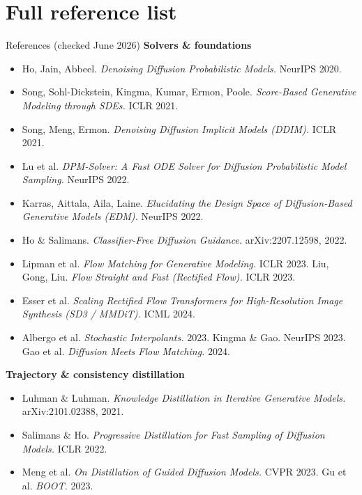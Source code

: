\documentclass[aspectratio=169,10pt]{beamer}
\begin{document}
\section{Full reference list}

\begin{frame}[allowframebreaks]{References (checked June 2026)}
  \scriptsize
  \textbf{Solvers \& foundations}
  \begin{itemize}
    \item Ho, Jain, Abbeel. \emph{Denoising Diffusion Probabilistic Models.} NeurIPS 2020.
    \item Song, Sohl-Dickstein, Kingma, Kumar, Ermon, Poole. \emph{Score-Based Generative Modeling through SDEs.} ICLR 2021.
    \item Song, Meng, Ermon. \emph{Denoising Diffusion Implicit Models (DDIM).} ICLR 2021.
    \item Lu et al. \emph{DPM-Solver: A Fast ODE Solver for Diffusion Probabilistic Model Sampling.} NeurIPS 2022.
    \item Karras, Aittala, Aila, Laine. \emph{Elucidating the Design Space of Diffusion-Based Generative Models (EDM).} NeurIPS 2022.
    \item Ho \& Salimans. \emph{Classifier-Free Diffusion Guidance.} arXiv:2207.12598, 2022.
    \item Lipman et al. \emph{Flow Matching for Generative Modeling.} ICLR 2023. \quad Liu, Gong, Liu. \emph{Flow Straight and Fast (Rectified Flow).} ICLR 2023.
    \item Esser et al. \emph{Scaling Rectified Flow Transformers for High-Resolution Image Synthesis (SD3 / MMDiT).} ICML 2024.
    \item Albergo et al. \emph{Stochastic Interpolants.} 2023. \quad Kingma \& Gao. NeurIPS 2023. \quad Gao et al. \emph{Diffusion Meets Flow Matching.} 2024.
  \end{itemize}
  \textbf{Trajectory \& consistency distillation}
  \begin{itemize}
    \item Luhman \& Luhman. \emph{Knowledge Distillation in Iterative Generative Models.} arXiv:2101.02388, 2021.
    \item Salimans \& Ho. \emph{Progressive Distillation for Fast Sampling of Diffusion Models.} ICLR 2022.
    \item Meng et al. \emph{On Distillation of Guided Diffusion Models.} CVPR 2023. \quad Gu et al. \emph{BOOT.} 2023.

\end{itemize}
\end{frame}
\end{document}
